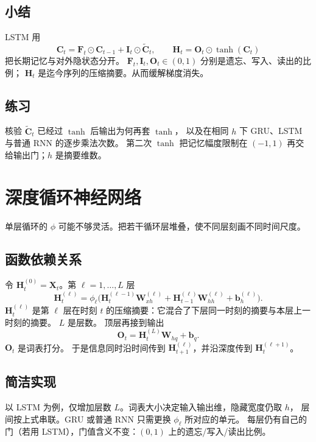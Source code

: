 \subsection{小结}

LSTM 用
\[
\bm{C}_t=\bm{F}_t\odot\bm{C}_{t-1}+\bm{I}_t\odot\tilde{\bm{C}}_t,
\qquad
\bm{H}_t=\bm{O}_t\odot\tanh(\bm{C}_t)
\]
把长期记忆与对外隐状态分开。
$\bm{F}_t,\bm{I}_t,\bm{O}_t\in(0,1)$ 分别是遗忘、写入、读出的比例；
$\bm{H}_t$ 是迄今序列的压缩摘要。从而缓解梯度消失。

\subsection{练习}

核验 $\tilde{\bm{C}}_t$ 已经过 $\tanh$ 后输出为何再套 $\tanh$，
以及在相同 $h$ 下 GRU、LSTM 与普通 RNN 的逐步乘法次数。
第二次 $\tanh$ 把记忆幅度限制在 $(-1,1)$ 再交给输出门；$h$ 是摘要维数。

\section{深度循环神经网络}



单层循环的 $\phi$ 可能不够灵活。把若干循环层堆叠，使不同层刻画不同时间尺度。

\subsection{函数依赖关系}

令 $\bm{H}_t^{(0)}=\bm{X}_t$。第 $\ell=1,\ldots,L$ 层
\[
\bm{H}_t^{(\ell)}
=
\phi_\ell\bigl(
\bm{H}_t^{(\ell-1)}\bm{W}_{xh}^{(\ell)}
+
\bm{H}_{t-1}^{(\ell)}\bm{W}_{hh}^{(\ell)}
+
\bm{b}_h^{(\ell)}
\bigr).
\]
$\bm{H}_t^{(\ell)}$ 是第 $\ell$ 层在时刻 $t$ 的压缩摘要：它混合了下层同一时刻的摘要与本层上一时刻的摘要。
$L$ 是层数。
顶层再接到输出
\[
\bm{O}_t=\bm{H}_t^{(L)}\bm{W}_{hq}+\bm{b}_q.
\]
$\bm{O}_t$ 是词表打分。
于是信息同时沿时间传到 $\bm{H}_{t+1}^{(\ell)}$，并沿深度传到 $\bm{H}_t^{(\ell+1)}$。

\subsection{简洁实现}

以 LSTM 为例，仅增加层数 $L$。词表大小决定输入输出维，隐藏宽度仍取 $h$，
层间按上式串联。GRU 或普通 RNN 只需更换 $\phi_\ell$ 所对应的单元。
每层仍有自己的门（若用 LSTM），门值含义不变：$(0,1)$ 上的遗忘/写入/读出比例。

